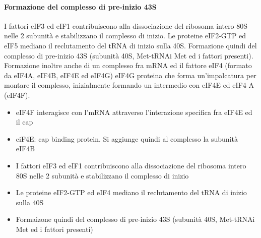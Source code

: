 \documentclass{article}
\begin{document}
\paragraph{Formazione del complesso di pre-inizio 43S}
I fattori eIF3 ed eIF1 contribuiscono alla dissociazione del ribosoma intero 80S nelle 2 subunità e stabilizzano il
complesso di inizio. Le proteine eIF2-GTP ed eIF5 mediano il reclutamento del tRNA di inizio sulla 40S. Formazione quindi del complesso di pre-inizio 43S (subunità 40S, Met-tRNAi Met ed i fattori presenti).\\
Formazione inoltre anche di un complesso fra mRNA ed il fattore eIF4 (formato da eIF4A, eIF4B, eIF4E ed eIF4G)
eIF4G proteina che forma un'impalcatura per montare il complesso,
inizialmente formando un intermedio con eIF4E ed eIF4 A (eIF4F).
\begin{itemize}
    \item eIF4F interagisce con l'mRNA attraverso l'interazione specifica fra eIF4E ed il cap
    \item eiF4E: cap binding protein. Si aggiunge quindi al complesso la subunità eIF4B
    \item I fattori eIF3 ed eIF1 contribuiscono alla dissociazione del ribosoma intero 80S nelle 2 subunità e stabilizzano il complesso di inizio
    \item Le proteine eIF2-GTP ed eIF4 mediano il reclutamento del tRNA di inizio sulla 40S
    \item Formaizone quindi del complesso di pre-inizio 43S (subunità 40S, Met-tRNAi Met ed i fattori presenti)
\end{itemize}
\end{document}
